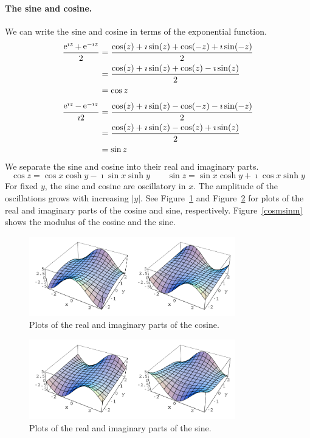 \paragraph{The sine and cosine.}
We can write the sine and cosine in terms of the exponential function.
\begin{align*}
  \frac{ \mathop{\mathrm{e}}\nolimits^{\imath z} + \mathop{\mathrm{e}}\nolimits^{-\imath z} }{ 2 }
  &= \frac{ \cos(z) + \imath \sin(z) + \cos(-z) + \imath \sin(-z) }{ 2 } 
  \\
  &= \frac{ \cos(z) + \imath \sin(z) + \cos(z) - \imath \sin(z) }{ 2 } 
  \\
  &= \cos z
\end{align*}
\begin{align*}
  \frac{ \mathop{\mathrm{e}}\nolimits^{\imath z} - \mathop{\mathrm{e}}\nolimits^{-\imath z} }{ \imath 2 }
  &= \frac{ \cos(z) + \imath \sin(z) - \cos(-z) - \imath \sin(-z) }{ 2 } 
  \\
  &= \frac{ \cos(z) + \imath \sin(z) - \cos(z) + \imath \sin(z) }{ 2 } 
  \\
  &= \sin z
\end{align*}
We separate the sine and cosine into their real and imaginary parts.
\[
\cos z = \cos x \cosh y - \imath \sin x \sinh y \qquad
\sin z = \sin x \cosh y + \imath \cos x \sinh y
\]
For fixed $y$, the sine and cosine are oscillatory in $x$.  The amplitude 
of the oscillations grows with increasing $|y|$.  See 
Figure~\ref{cosreim} and Figure~\ref{sinreim} for plots of the real
and imaginary parts of the cosine and sine, respectively.  
Figure~\ref{cosmsinm} shows the modulus of the cosine and the sine.

\begin{figure}[htbp!]
  \begin{center}
    \includegraphics[width=0.8\textwidth]{fcv/function/cosreim}
  \end{center}
  \caption{Plots of the real and imaginary parts of the cosine.}
  \label{cosreim}
\end{figure}

\begin{figure}[htbp!]
  \begin{center}
    \includegraphics[width=0.8\textwidth]{fcv/function/sinreim}
  \end{center}
  \caption{Plots of the real and imaginary parts of the sine.}
  \label{sinreim}
\end{figure}

